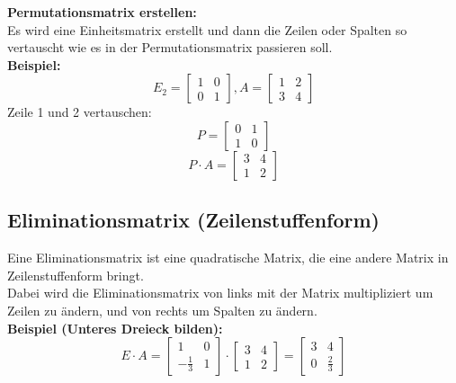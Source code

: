 \documentclass[12pt,a4paper]{article}
\begin{document}
\textbf{Permutationsmatrix erstellen:} \\
Es wird eine Einheitsmatrix erstellt und dann die Zeilen oder Spalten so vertauscht wie es in der Permutationsmatrix passieren soll. \\
\textbf{Beispiel:}
\[
E_2 =
\begin{bmatrix}
1 & 0 \\
0 & 1
\end{bmatrix}
,A =
\begin{bmatrix}
    1 & 2 \\
    3 & 4
\end{bmatrix}
\]
Zeile 1 und 2 vertauschen:
\[
P =
\begin{bmatrix}
0 & 1 \\
1 & 0
\end{bmatrix}
\]
\[
P \cdot A = 
\begin{bmatrix}
    3 & 4 \\
    1 & 2
\end{bmatrix}
\]


\subsection{Eliminationsmatrix (Zeilenstuffenform)}
Eine Eliminationsmatrix ist eine quadratische Matrix, die eine andere Matrix in Zeilenstuffenform bringt. \\
Dabei wird die Eliminationsmatrix von links mit der Matrix multipliziert um Zeilen zu ändern, und von rechts um Spalten zu ändern. \\
\textbf{Beispiel (Unteres Dreieck bilden):}
\[
E \cdot A
=
\begin{bmatrix}
1 & 0 \\
-\frac{1}{3} & 1
\end{bmatrix}
\cdot
\begin{bmatrix}
3 & 4 \\
1 & 2
\end{bmatrix}
=
\begin{bmatrix}
3 & 4 \\
0 & \frac{2}{3}
\end{bmatrix}
\]
\end{document}
